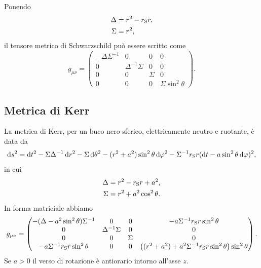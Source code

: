 Ponendo
\begin{subequations}
  \begin{align}
    \Delta             & = r^{2} - r_{\textup{S}}r, \\
    \Sigma             & = r^{2},
  \end{align}
\end{subequations}
il tensore metrico di Schwarzschild può essere scritto come
\begin{equation}
  g_{\mu\nu} =
  \begin{pmatrix}
    -\Delta\Sigma^{-1} & 0                 & 0      & 0 \\
    0                  & \Delta^{-1}\Sigma & 0      & 0 \\
    0                  & 0                 & \Sigma & 0 \\
    0                  & 0                 & 0      & \Sigma\sin^{2}\theta
  \end{pmatrix}.
\end{equation}

\subsection{Metrica di Kerr}
\label{sec:metrica-kerr}

La metrica di Kerr, per un buco nero sferico, elettricamente neutro e ruotante,
è data da
\begin{equation}
  \label{eq:metrica-kerr}
  \mathop{}\!\mathrm{d} s^{2} = \mathop{}\!\mathrm{d} t^{2} - \Sigma\Delta^{-1} \mathop{}\!\mathrm{d} r^{2} - \Sigma\mathop{}\!\mathrm{d}\theta^{2} -
  (r^{2} + a^{2})\sin^{2}\theta\mathop{}\!\mathrm{d}\varphi^{2} - \Sigma^{-1}r_{\textup{S}}r(\mathop{}\!\mathrm{d} t -
  a\sin^{2}\theta\mathop{}\!\mathrm{d}\varphi)^{2},
\end{equation}
in cui
\begin{subequations}
  \begin{align}
    \Delta &= r^{2} - r_{\textup{S}}r + a^{2}, \\
    \Sigma &= r^{2} + a^{2}\cos^{2}\theta.
  \end{align}
\end{subequations}
In forma matriciale abbiamo
\begin{equation}
  g_{\mu\nu} =
  \begin{pmatrix}
    -(\Delta - a^{2}\sin^{2}\theta)\Sigma^{-1} & 0 & 0 &
    -a\Sigma^{-1}r_{\textup{S}}r\sin^{2}\theta \\
    0 & \Delta^{-1}\Sigma & 0 & 0 \\
    0 & 0 & \Sigma & 0 \\
    -a\Sigma^{-1}r_{\textup{S}}r\sin^{2}\theta & 0 & 0 & \bigl((r^{2} + a^{2}) +
    a^{2}\Sigma^{-1}r_{\textup{S}}r\sin^{2}\theta\bigr)\sin^{2}\theta
  \end{pmatrix}.
\end{equation}
Se \(a > 0\) il verso di rotazione è antiorario intorno all'asse \(z\).

